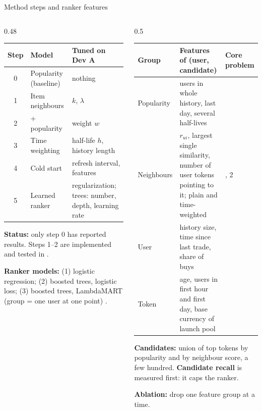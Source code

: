 \documentclass[aspectratio=169,10pt]{beamer}
\newcommand{\toindex}{\hfill\hyperlink{index}{\beamerreturnbutton{index}}}
\begin{document}
\begin{frame}[label=ranker]{Method steps and ranker features \toindex}
  \scriptsize
  \begin{columns}[T]
    \begin{column}{0.48\textwidth}
      \renewcommand{\arraystretch}{1.15}
      \begin{tabular}{@{}cp{2.3cm}p{2.3cm}@{}}
        \toprule
        Step & Model & Tuned on Dev A \\
        \midrule
        0 & Popularity (baseline) & nothing \\
        1 & Item neighbours & $k$, $\lambda$ \\
        2 & + popularity & weight $w$ \\
        3 & Time weighting & half-life $h$, history length \\
        4 & Cold start & refresh interval, features \\
        5 & Learned ranker & regularization; trees: number, depth, learning rate \\
        \bottomrule
      \end{tabular}
      \par\medskip
      \textbf{Status:} only step 0 has reported results. Steps 1--2 are implemented and tested in .
      \par\medskip
      \textbf{Ranker models:} (1) logistic regression; (2) boosted trees, logistic loss; (3) boosted trees, LambdaMART (group = one user at one point) \cite{burges2010}.
    \end{column}
    \begin{column}{0.5\textwidth}
      \renewcommand{\arraystretch}{1.15}
      \begin{tabularx}{\textwidth}{@{}p{1.5cm}X>{\centering\arraybackslash}p{0.9cm}@{}}
        \toprule
        Group & Features of (user, candidate) & Core problem \\
        \midrule
        Popularity & users in whole history, last day, several half-lives & 2 \\
        Neighbours & $r_{ui}$, largest single similarity, number of user tokens pointing to it; plain and time-weighted & 1, 2 \\
        User & history size, time since last trade, share of buys & 1 \\
        Token & age, users in first hour and first day, base currency of launch pool & 3 \\
        \bottomrule
      \end{tabularx}
      \par\medskip
      \textbf{Candidates:} union of top tokens by popularity and by neighbour score, a few hundred. \textbf{Candidate recall} is measured first: it caps the ranker.
      \par\smallskip
      \textbf{Ablation:} drop one feature group at a time.
    \end{column}
  \end{columns}
\end{frame}
\end{document}
